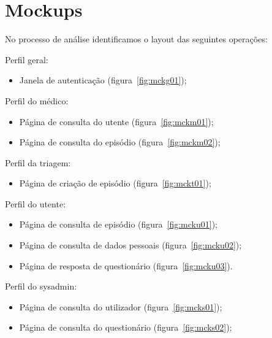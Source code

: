 
\section{Mockups}

No processo de análise identificamos o layout das seguintes operações:

\begin{minipage}{\linewidth}
	Perfil geral:
\begin{itemize}
	\item Janela de autenticação (figura~\ref{fig:mckg01});
\end{itemize}
\end{minipage}

\begin{minipage}{\linewidth}
	Perfil do médico:
\begin{itemize}
	\item Página de consulta do utente (figura~\ref{fig:mckm01});
	\item Página de consulta do episódio (figura~\ref{fig:mckm02});
\end{itemize}
\end{minipage}

\begin{minipage}{\linewidth}
	Perfil da triagem:
\begin{itemize}
	\item Página de criação de episódio (figura~\ref{fig:mckt01});
\end{itemize}
\end{minipage}

\begin{minipage}{\linewidth}
	Perfil do utente:
\begin{itemize}
	\item Página de consulta de episódio (figura~\ref{fig:mcku01});
	\item Página de consulta de dados pessoais (figura~\ref{fig:mcku02});
	\item Página de resposta de questionário (figura~\ref{fig:mcku03}).
\end{itemize}
\end{minipage}

\begin{minipage}{\linewidth}
	Perfil do sysadmin:
	\begin{itemize}
		\item Página de consulta do utilizador (figura~\ref{fig:mcks01});
		\item Página de consulta do questionário (figura~\ref{fig:mcks02});
	\end{itemize}
\end{minipage}

